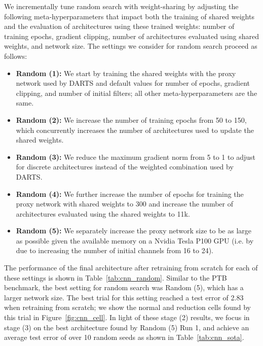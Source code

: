 \documentclass[acmlarge, nonacm]{acmart}
\begin{document}
We incrementally tune random search with weight-sharing by adjusting the following meta-hyperparameters that impact both the training of shared weights and the evaluation of architectures using these trained weights: number of training epochs, gradient clipping, number of architectures evaluated using shared weights, and network size. The settings we consider for random search proceed as follows:
\begin{itemize}
    \item \textbf{Random (1):} We start by training the shared weights with the proxy network used by DARTS and default values for number of epochs, gradient clipping, and number of initial filters; all other meta-hyperparameters are the same.
    \item \textbf{Random (2):} We increase the number of training epochs from 50 to 150, which concurrently increases the number of architectures used to update the shared weights.
    \item \textbf{Random (3):} We reduce the maximum gradient norm from 5 to 1 to adjust for discrete architectures instead of the weighted combination used by DARTS.
    \item \textbf{Random (4):} We further increase the number of epochs for training the proxy network with shared weights to 300 and increase the number of architectures evaluated using the shared weights to 11k. 
    \item \textbf{Random (5):} We separately increase the proxy network size to be as large as possible given the available memory on a Nvidia Tesla P100 GPU (i.e. by  due to increasing the number of initial channels from 16 to 24).
\end{itemize} 
The performance of the final architecture after retraining from scratch for each of these settings is shown in Table~\ref{tab:cnn_random}. 
Similar to the PTB benchmark, the best setting for random search was Random (5), which has a larger network size.  The best trial for this setting reached a test error of 2.83 when retraining from scratch; we show the normal and reduction cells found by this trial in Figure~\ref{fig:cnn_cell}.
In light of these stage (2) results, we focus in stage (3) on the best architecture found by Random (5) Run 1, and achieve an average test error of  over 10 random seeds as shown in Table~\ref{tab:cnn_sota}.
\end{document}

